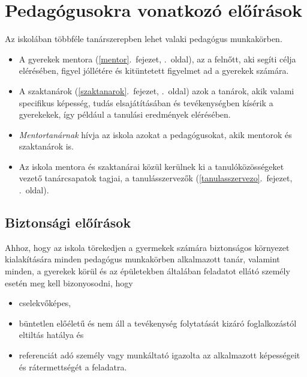 \hypertarget{pedagogusokra-vonatkozo-eloirasok}{%
\section{Pedagógusokra vonatkozó
előírások}\label{pedagogusokra-vonatkozo-eloirasok}}

Az iskolában többféle tanárszerepben lehet valaki pedagógus munkakörben.

\begin{itemize}
\tightlist
\item
  A gyerekek mentora (\ref{mentor}.~fejezet, \pageref{mentor}.~oldal),
  az a felnőtt, aki segíti célja elérésében, figyel jóllétére és
  kitüntetett figyelmet ad a gyerekek számára.
\item
  A
  szaktanárok (\ref{szaktanarok}.~fejezet, \pageref{szaktanarok}.~oldal)
  azok a tanárok, akik valami specifikus képesség, tudás elsajátításában
  és tevékenységben kísérik a gyerekekek, így például a tanulási
  eredmények elérésében.
\item
  \emph{Mentortanárnak} hívja az iskola azokat a pedagógusokat, akik
  mentorok és szaktanárok is.
\item
  Az iskola mentora és szaktanárai közül kerülnek ki a
  tanulóközösségeket vezető tanárcsapatok tagjai, a
  tanulásszervezők (\ref{tanulasszervezo}.~fejezet, \pageref{tanulasszervezo}.~oldal).
\end{itemize}

\hypertarget{biztonsagi-eloirasok}{%
\subsection{Biztonsági előírások}\label{biztonsagi-eloirasok}}

Ahhoz, hogy az iskola törekedjen a gyermekek számára biztonságos
környezet kialakítására minden pedagógus munkakörben alkalmazott tanár,
valamint minden, a gyerekek körül és az épületekben általában feladatot
ellátó személy esetén meg kell bizonyosodni, hogy

\begin{itemize}
\tightlist
\item
  cselekvőképes,
\item
  büntetlen előéletű és nem áll a tevékenység folytatását kizáró
  foglalkozástól eltiltás hatálya és
\item
  referenciát adó személy vagy munkáltató igazolta az alkalmazott
  képességeit és rátermettségét a feladatra.
\end{itemize}

